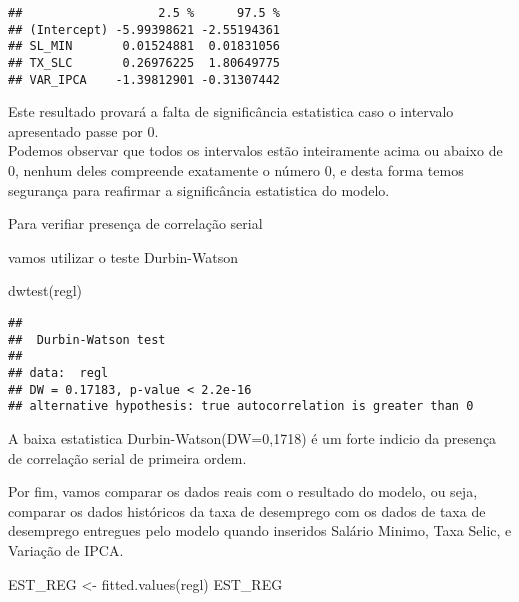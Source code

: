 \documentclass[
]{article}
\newenvironment{Shaded}{\begin{snugshade}}{\end{snugshade}}
\newcommand{\FunctionTok}[1]{\textcolor[rgb]{0.00,0.00,0.00}{#1}}
\newcommand{\NormalTok}[1]{#1}
\newcommand{\OtherTok}[1]{\textcolor[rgb]{0.56,0.35,0.01}{#1}}
\begin{document}
\begin{verbatim}
##                   2.5 %      97.5 %
## (Intercept) -5.99398621 -2.55194361
## SL_MIN       0.01524881  0.01831056
## TX_SLC       0.26976225  1.80649775
## VAR_IPCA    -1.39812901 -0.31307442
\end{verbatim}

Este resultado provará a falta de significância estatistica caso o
intervalo apresentado passe por 0.\\
Podemos observar que todos os intervalos estão inteiramente acima ou
abaixo de 0, nenhum deles compreende exatamente o número 0, e desta
forma temos segurança para reafirmar a significância estatistica do
modelo.

Para verifiar presença de correlação serial

vamos utilizar o teste Durbin-Watson

\begin{Shaded}
\begin{Highlighting}[]
\FunctionTok{dwtest}\NormalTok{(regl)}
\end{Highlighting}
\end{Shaded}

\begin{verbatim}
## 
##  Durbin-Watson test
## 
## data:  regl
## DW = 0.17183, p-value < 2.2e-16
## alternative hypothesis: true autocorrelation is greater than 0
\end{verbatim}

A baixa estatistica Durbin-Watson(DW=0,1718) é um forte indicio da
presença de correlação serial de primeira ordem.

Por fim, vamos comparar os dados reais com o resultado do modelo, ou
seja, comparar os dados históricos da taxa de desemprego com os dados de
taxa de desemprego entregues pelo modelo quando inseridos Salário
Minimo, Taxa Selic, e Variação de IPCA.

\begin{Shaded}
\begin{Highlighting}[]
\NormalTok{EST\_REG }\OtherTok{\textless{}{-}} \FunctionTok{fitted.values}\NormalTok{(regl)                                                       }
\NormalTok{EST\_REG}
\end{Highlighting}
\end{Shaded}
\end{document}
